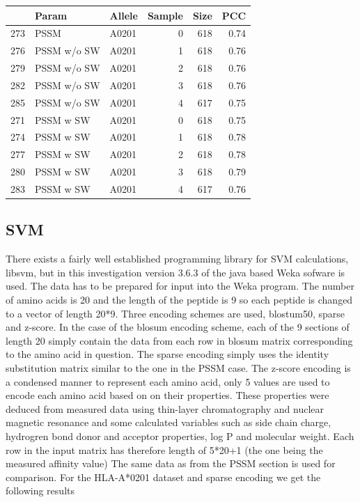 \begin{table}[ht]
\begin{center}
\begin{tabular}{rllrrr}
  \hline
 & Param & Allele & Sample & Size & PCC \\ 
  \hline
273 & PSSM & A0201 &   0 & 618 & 0.74 \\ 
  276 & PSSM w/o SW & A0201 &   1 & 618 & 0.76 \\ 
  279 & PSSM w/o SW & A0201 &   2 & 618 & 0.76 \\ 
  282 & PSSM w/o SW & A0201 &   3 & 618 & 0.76 \\ 
  285 & PSSM w/o SW & A0201 &   4 & 617 & 0.75 \\ 
  271 & PSSM w SW & A0201 &   0 & 618 & 0.75 \\ 
  274 & PSSM w SW & A0201 &   1 & 618 & 0.78 \\ 
  277 & PSSM w SW & A0201 &   2 & 618 & 0.78 \\ 
  280 & PSSM w SW & A0201 &   3 & 618 & 0.79 \\ 
  283 & PSSM w SW & A0201 &   4 & 617 & 0.76 \\ 
   \hline
\end{tabular}
\end{center}
\end{table}


\subsection*{SVM}
There exists a fairly well established programming library for SVM calculations, libsvm, but in this investigation version 3.6.3 of the java based Weka sofware is used. 
The data has to be prepared for input into the Weka program. 
The number of amino acids is 20 and the length of the peptide is 9 so each peptide is changed to a vector of length 20*9. 
Three encoding schemes are used, blostum50, sparse and z-score. 
In the case of the blosum encoding scheme, each of the 9 sections of length 20 simply contain the data from each row in blosum matrix corresponding to the amino acid in question.
The sparse encoding simply uses the identity substitution matrix similar to the one in the PSSM case. 
The z-score encoding is a condensed manner to represent each amino acid, only 5 values are used to encode each amino acid based on on their properties. 
These properties were deduced from measured data using thin-layer chromatography and nuclear magnetic resonance and some calculated variables 
such as side chain charge, hydrogren bond donor and acceptor properties, log P and molecular weight. 
Each row in the input matrix has therefore length of 5*20+1 (the one being the measured affinity value)
The same data as from the PSSM section is used for comparison. For the HLA-A*0201 dataset and sparse encoding we get the following results

